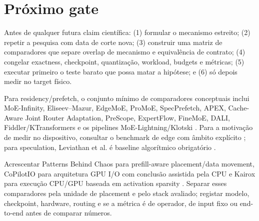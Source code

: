 \section{Próximo gate}
Antes de qualquer futura claim científica: (1) formular o mecanismo estreito; (2) repetir a pesquisa com data de corte nova; (3) construir uma matriz de comparadores que separe overlap de mecanismo e equivalência de contrato; (4) congelar exactness, checkpoint, quantização, workload, budgets e métricas; (5) executar primeiro o teste barato que possa matar a hipótese; e (6) só depois medir no target físico.

Para residency/prefetch, o conjunto mínimo de comparadores conceptuais inclui MoE-Infinity, Eliseev--Mazur, EdgeMoE, ProMoE, SpecPrefetch, APEX, Cache-Aware Joint Router Adaptation, PreScope, ExpertFlow, FineMoE, DALI, Fiddler/KTransformers e os pipelines MoE-Lightning/Klotski \cite{xue2024moeinfinity,eliseev2023offloading,yi2023edgemoe,song2024promoe,kong2026specprefetch,kanani2026apex,wu2026cacheaware,yu2025prescope,he2026expertflow,yu2026finemoe,zhu2026dali,kamahori2025fiddler,chen2025ktransformers,cao2025moelightning,fang2025klotski}. Para a motivação de medir no dispositivo, consultar o benchmark de edge com âmbito explícito \cite{alfarizy2026consumer}; para speculation, Leviathan et al. é baseline algorítmico obrigatório \cite{leviathan2023speculative}.

Acrescentar Patterns Behind Chaos para prefill-aware placement/data movement, CoPilotIO para arquitetura GPU I/O com conclusão assistida pela CPU e Kairox para execução CPU/GPU baseada em activation sparsity \cite{yu2026patterns,chen2026copilotio,jiang2026kairox}. Separar esses comparadores pela unidade de placement e pelo stack avaliado; registar modelo, checkpoint, hardware, routing e se a métrica é de operador, de input fixo ou end-to-end antes de comparar números.

